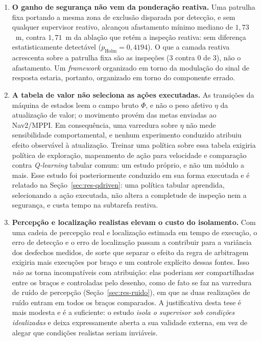 \begin{enumerate}
    \item \textbf{O ganho de segurança não vem da ponderação reativa.} Uma patrulha
    fixa portando a mesma zona de exclusão disparada por detecção, e sem qualquer
    supervisor reativo, alcançou afastamento mínimo mediano de $1{,}73$~m, contra
    $1{,}71$~m da ablação que retém a inspeção reativa: sem diferença
    estatisticamente detectável ($p_{\mathrm{Holm}}=0{,}4194$). O que a camada
    reativa acrescenta sobre a patrulha fixa são as inspeções ($3$ contra $0$ de
    $3$), não o afastamento. Um \textit{framework} organizado em torno da modulação
    do sinal de resposta estaria, portanto, organizado em torno do componente errado.

    \item \textbf{A tabela de valor não seleciona as ações executadas.} As transições
    da máquina de estados leem o campo bruto $\Phi$, e não o peso afetivo $\eta$ da
    atualização de valor; o movimento provém das metas enviadas ao Nav2/MPPI. Em
    consequência, uma varredura sobre $\eta$ não mede sensibilidade comportamental,
    e nenhum experimento conduzido atribuiu efeito observável à atualização. Treinar
    uma política sobre essa tabela exigiria política de exploração, mapeamento de
    ação para velocidade e comparação contra \textit{Q-learning} tabular comum: um estudo próprio, e não um módulo a mais. Esse estudo foi posteriormente
    conduzido em sua forma executada e é relatado na Seção~\ref{sec:res-qdriven}:
    uma política tabular aprendida, selecionando a ação executada, não altera a
    completude de inspeção nem a segurança, e custa tempo na subtarefa reativa.

    \item \textbf{Percepção e localização realistas elevam o custo do isolamento.} Com
    uma cadeia de percepção real e localização estimada em tempo de execução, o erro de
    detecção e o erro de localização passam a contribuir para a variância dos desfechos
    medidos, de sorte que separar o efeito da regra de arbitragem exigiria mais
    execuções por braço e um controle explícito dessas fontes. Isso \emph{não} as torna
    incompatíveis com atribuição: elas poderiam ser compartilhadas entre os braços e
    controladas pelo desenho, como de fato se faz na varredura de ruído de percepção
    (Seção~\ref{sec:res-ruido}), em que as duas realizações de ruído entram em todos os
    braços comparados. A justificativa desta tese é mais modesta e é a suficiente: o
    estudo \emph{isola o supervisor sob condições idealizadas} e deixa expressamente
    aberta a sua validade externa, em vez de alegar que condições realistas seriam
    inviáveis.
\end{enumerate}

